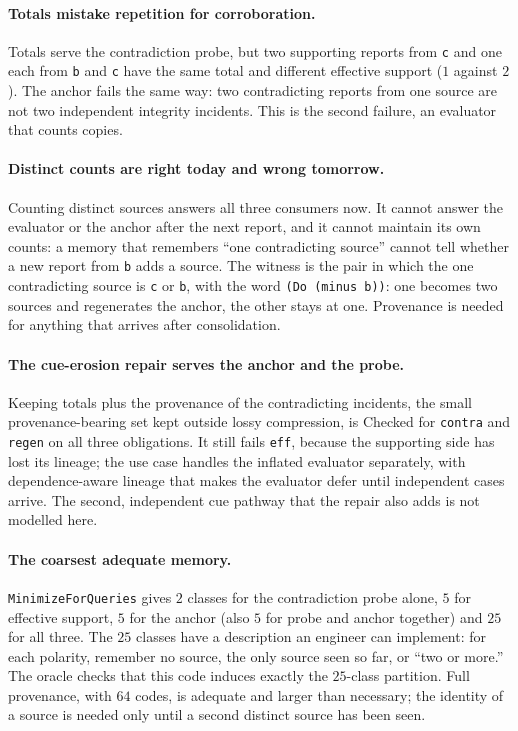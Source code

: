 \documentclass[11pt]{article}
\newcommand{\code}[1]{\texttt{#1}}
\theoremstyle{definition}
\theoremstyle{plain}
\begin{document}
\paragraph{Totals mistake repetition for corroboration.} Totals serve the contradiction probe, but
two supporting reports from \code{c} and one each from \code{b} and \code{c} have the same total and
different effective support ($1$ against $2$). The anchor fails the same way: two contradicting
reports from one source are not two independent integrity incidents. This is the second failure, an
evaluator that counts copies.

\paragraph{Distinct counts are right today and wrong tomorrow.} Counting distinct sources answers
all three consumers now. It cannot answer the evaluator or the anchor after the next report, and it
cannot maintain its own counts: a memory that remembers ``one contradicting source'' cannot tell
whether a new report from \code{b} adds a source. The witness is
the pair in which the one contradicting source is \code{c} or \code{b}, with the word
\code{(Do (minus b))}: one becomes two sources and regenerates the anchor, the other stays at one.
Provenance is needed for anything that arrives after consolidation.

\paragraph{The cue-erosion repair serves the anchor and the probe.} Keeping totals plus the
provenance of the contradicting incidents, the small provenance-bearing set kept outside lossy
compression, is Checked for \code{contra} and \code{regen} on all three obligations. It still fails
\code{eff}, because the supporting side has lost its lineage; the use case handles the inflated
evaluator separately, with dependence-aware lineage that makes the evaluator defer until
independent cases arrive. The second, independent cue pathway that the repair also adds is not
modelled here.

\paragraph{The coarsest adequate memory.} \code{MinimizeForQueries} gives $2$ classes for the
contradiction probe alone, $5$ for effective support, $5$ for the anchor (also $5$ for probe and
anchor together) and $25$ for all three. The $25$ classes have a description an engineer can
implement: for each polarity, remember no source, the only source seen so far, or ``two or more.''
The oracle checks that this code induces exactly the $25$-class partition. Full provenance, with
$64$ codes, is adequate and larger than necessary; the identity of a source is needed only until a
second distinct source has been seen.
\end{document}
